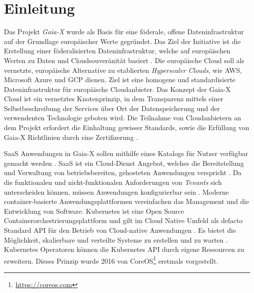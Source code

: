 \chapter{Einleitung}
\label{chap:einleitung}


Das Projekt \emph{Gaia-X} wurde als Basis für eine föderale, offene Dateninfrastruktur auf der Grundlage europäischer Werte gegründet.
Das Ziel der Initiative ist die Erstellung einer föderalisierten Dateninfrastruktur, 
welche auf europäischen Werten zu Daten und Cloudsouveränität basiert \cite{GaiaXArchitecture2021}.
Die europäische Cloud soll als vernetzte, europäische Alternative zu etablierten \emph{Hyperscaler Clouds}, wie \ac{AWS},
Microsoft Azure und \ac{GCP} dienen. Ziel ist eine homogene und standardisierte Dateninfrastruktur für europäische Cloudanbieter.
Das Konzept der Gaia-X Cloud ist ein vernetztes Knotenprinzip, in dem Transparenz mittels einer Selbstbeschreibung der Services
über Ort der Datenspeicherung und der verwendenten Technologie geboten wird.
Die Teilnahme von Cloudanbietern an dem Projekt erfordert die Einhaltung gewisser Standards, 
sowie die Erfüllung von Gaia-X Richtlinien durch eine Zertifizerung \cite{BMWi2019}.


\ac{SaaS} Anwendungen in Gaia-X sollen mithilfe eines Katalogs für Nutzer verfügbar gemacht werden \cite{GXFS2021}.
\ac{SaaS} ist ein Cloud-Dienst Angebot, welches die Bereitstellung und Verwaltung von betriebsbereiten, 
gehosteten Anwendungen verspricht \cite{Krebs2012}.
Da die funktionalen und nicht-funktionalen Anforderungen von \emph{Tenants} sich unterscheiden können,
müssen Anwendungen konfigurierbar sein \cite{Schroeter2012}. 
Moderne container-basierte Anwendungsplattformen vereinfachen das Management und die Entwicklung
von Software. Kubernetes \cite{kubernetes} ist eine Open Source Containerorchestrierungsplattform und gilt im
Cloud Native Umfeld als defacto Standard API für den Betrieb von Cloud-native Anwendungen \cite{Burns2019}.
Es bietet die Möglichkeit, skalierbare und verteilte Systeme zu erstellen und zu warten \cite{Burns2019}.
Kubernetes Operatoren können die Kubernetes API durch eigene Ressourcen zu erweitern. 
Dieses Prinzip wurde 2016 von CoreOS\footnote{\url{https://coreos.com}} erstmals vorgestellt.

